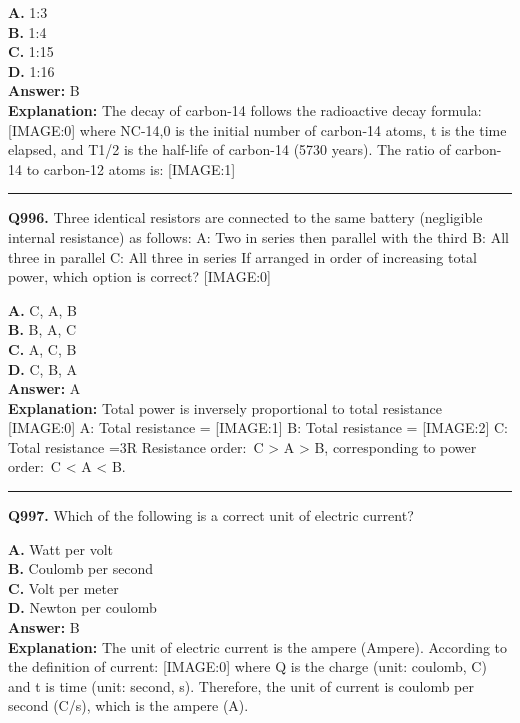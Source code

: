 \documentclass[12pt]{article}
\begin{document}
\textbf{A.} 1:3 \\
\textbf{B.} 1:4 \\
\textbf{C.} 1:15 \\
\textbf{D.} 1:16 \\

\textbf{Answer:} B \\
\textbf{Explanation:} The decay of carbon-14 follows the radioactive decay formula:
[IMAGE:0]
where NC-14,0​ is the initial number of carbon-14 atoms, t is the time elapsed, and T1/2​ is the half-life of carbon-14 (5730 years). The ratio of carbon-14 to carbon-12 atoms is:
[IMAGE:1]

\hrule
\vspace{1em}


\noindent
\textbf{Q996.} Three identical resistors are connected to the same battery (negligible internal resistance) as follows:
A: Two in series then parallel with the third
B: All three in parallel
C: All three in series
If arranged in order of increasing total power, which option is correct?
[IMAGE:0]



\textbf{A.} C, A, B \\
\textbf{B.} B, A, C \\
\textbf{C.} A, C, B \\
\textbf{D.} C, B, A \\

\textbf{Answer:} A \\
\textbf{Explanation:} Total power is inversely proportional to total resistance
[IMAGE:0]
A: Total resistance =
[IMAGE:1]
B: Total resistance =
[IMAGE:2]
C: Total resistance =3R
Resistance order: C > A > B, corresponding to power order: C < A < B.

\hrule
\vspace{1em}


\noindent
\textbf{Q997.} Which of the following is a correct unit of electric current?



\textbf{A.} Watt per volt \\
\textbf{B.} Coulomb per second \\
\textbf{C.} Volt per meter \\
\textbf{D.} Newton per coulomb \\

\textbf{Answer:} B \\
\textbf{Explanation:} The unit of electric current is the ampere (Ampere). According to the definition of current:
[IMAGE:0]
where Q is the charge (unit: coulomb, C) and t is time (unit: second, s). Therefore, the unit of current is coulomb per second (C/s), which is the ampere (A).
\end{document}
